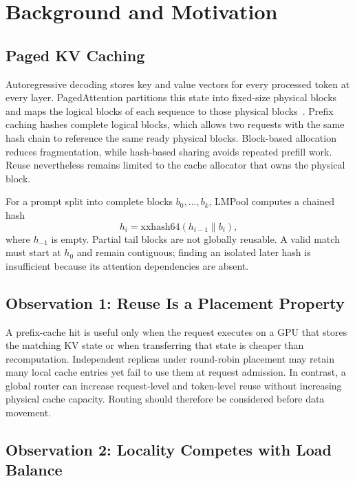 \documentclass{article}
\newcommand{\sys}{LMPool}
\begin{document}
\section{Background and Motivation}
\label{sec:bg}

\subsection{Paged KV Caching}

Autoregressive decoding stores key and value vectors for every processed token at every layer. PagedAttention partitions this state into fixed-size physical blocks and maps the logical blocks of each sequence to those physical blocks~\citep{vLLM}. Prefix caching hashes complete logical blocks, which allows two requests with the same hash chain to reference the same ready physical blocks. Block-based allocation reduces fragmentation, while hash-based sharing avoids repeated prefill work. Reuse nevertheless remains limited to the cache allocator that owns the physical block.

For a prompt split into complete blocks $b_0,\ldots,b_k$, \sys{} computes a chained hash
\begin{equation}
  h_i = \mathrm{xxhash64}(h_{i-1} \parallel b_i),
\end{equation}
where $h_{-1}$ is empty. Partial tail blocks are not globally reusable. A valid match must start at $h_0$ and remain contiguous; finding an isolated later hash is insufficient because its attention dependencies are absent.

\subsection{Observation 1: Reuse Is a Placement Property}

A prefix-cache hit is useful only when the request executes on a GPU that stores the matching KV state or when transferring that state is cheaper than recomputation. Independent replicas under round-robin placement may retain many local cache entries yet fail to use them at request admission. In contrast, a global router can increase request-level and token-level reuse without increasing physical cache capacity. Routing should therefore be considered before data movement.

\subsection{Observation 2: Locality Competes with Load Balance}
\end{document}
